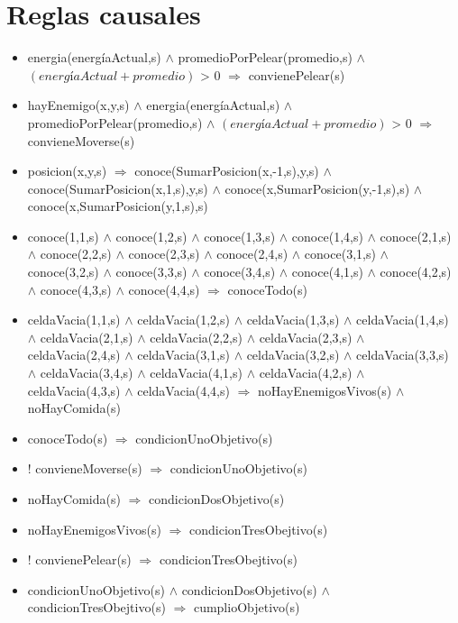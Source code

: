 \section{Reglas causales}

\begin{itemize}

\item  energia(energíaActual,s)
$\land$ promedioPorPelear(promedio,s) $\land$ $(energíaActual + promedio)$ > 0
$\Rightarrow$ convienePelear(s)

\item hayEnemigo(x,y,s) $\land$ energia(energíaActual,s)
$\land$ promedioPorPelear(promedio,s) $\land$ $(energíaActual + promedio)$ > 0
$\Rightarrow$ convieneMoverse(s)

\item posicion(x,y,s) $\Rightarrow$
 conoce(SumarPosicion(x,-1,s),y,s) $\land$  
 conoce(SumarPosicion(x,1,s),y,s) $\land$ 
 conoce(x,SumarPosicion(y,-1,s),s) $\land$ 
 conoce(x,SumarPosicion(y,1,s),s) 
 
\item conoce(1,1,s) $\land$ conoce(1,2,s) $\land$ conoce(1,3,s) $\land$ 
 conoce(1,4,s) $\land$ conoce(2,1,s) $\land$ conoce(2,2,s) $\land$ 
 conoce(2,3,s) $\land$ conoce(2,4,s) $\land$ conoce(3,1,s) $\land$ 
 conoce(3,2,s) $\land$ conoce(3,3,s) $\land$ conoce(3,4,s) $\land$ 
 conoce(4,1,s) $\land$ conoce(4,2,s) $\land$ conoce(4,3,s) $\land$ 
 conoce(4,4,s) $\Rightarrow$ conoceTodo(s)
 
\item celdaVacia(1,1,s) $\land$ celdaVacia(1,2,s) $\land$ celdaVacia(1,3,s) $\land$ 
 celdaVacia(1,4,s) $\land$ celdaVacia(2,1,s) $\land$ celdaVacia(2,2,s) $\land$ 
 celdaVacia(2,3,s) $\land$ celdaVacia(2,4,s) $\land$ celdaVacia(3,1,s) $\land$ 
 celdaVacia(3,2,s) $\land$ celdaVacia(3,3,s) $\land$ celdaVacia(3,4,s) $\land$ 
 celdaVacia(4,1,s) $\land$ celdaVacia(4,2,s) $\land$ celdaVacia(4,3,s) $\land$ 
 celdaVacia(4,4,s) 
 $\Rightarrow$ noHayEnemigosVivos(s) $\land$ noHayComida(s)
 
\item conoceTodo(s) $\Rightarrow$ condicionUnoObjetivo(s)
\item ! convieneMoverse(s) $\Rightarrow$ condicionUnoObjetivo(s)
\item noHayComida(s) $\Rightarrow$ condicionDosObjetivo(s)
\item noHayEnemigosVivos(s) $\Rightarrow$ condicionTresObejtivo(s)
\item ! convienePelear(s) $\Rightarrow$ condicionTresObejtivo(s)

\item  condicionUnoObjetivo(s) $\land$ condicionDosObjetivo(s)
$\land$ condicionTresObejtivo(s) $\Rightarrow$ cumplioObjetivo(s)

\end{itemize}


